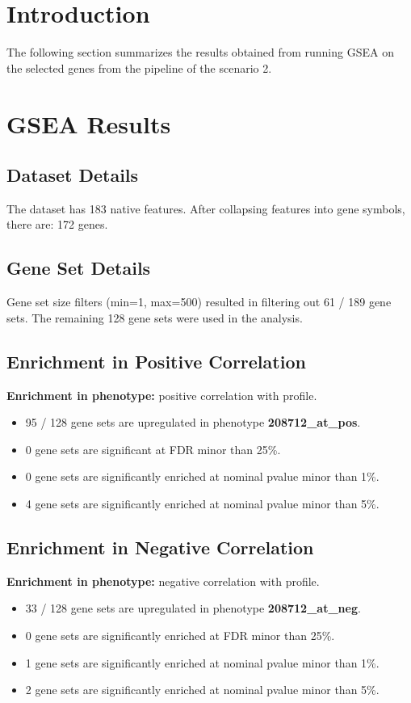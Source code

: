 
\section{Introduction}
The following section summarizes the results obtained from running GSEA on the selected genes from the pipeline of the scenario 2.

\section{GSEA Results}
\subsection{Dataset Details}
The dataset has 183 native features.
After collapsing features into gene symbols, there are: 172 genes.

\subsection{Gene Set Details}
Gene set size filters (min=1, max=500) resulted in filtering out 61 / 189 gene sets.
The remaining 128 gene sets were used in the analysis.

\subsection{Enrichment in Positive Correlation}
\textbf{Enrichment in phenotype:} positive correlation with profile.
\begin{itemize}
\item 95 / 128 gene sets are upregulated in phenotype \textbf{208712\_at\_pos}.
\item 0 gene sets are significant at FDR minor than 25\%.
\item 0 gene sets are significantly enriched at nominal pvalue minor than 1\%.
\item 4 gene sets are significantly enriched at nominal pvalue minor than 5\%.
\end{itemize}

\subsection{Enrichment in Negative Correlation}
\textbf{Enrichment in phenotype:} negative correlation with profile.
\begin{itemize}
\item 33 / 128 gene sets are upregulated in phenotype \textbf{208712\_at\_neg}.
\item 0 gene sets are significantly enriched at FDR minor than 25\%.
\item 1 gene sets are significantly enriched at nominal pvalue minor than 1\%.
\item 2 gene sets are significantly enriched at nominal pvalue minor than 5\%.

\end{itemize}

